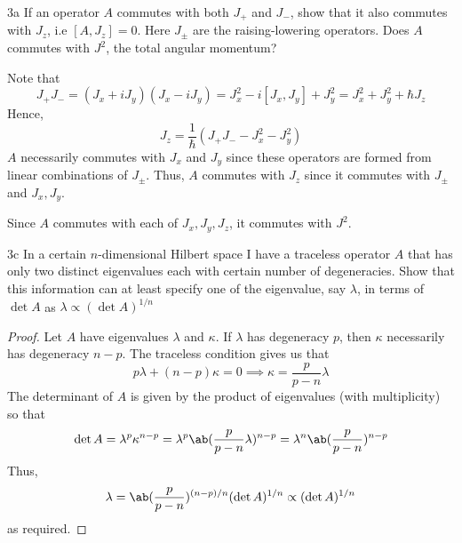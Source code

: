 \documentclass[12pt]{article}
\begin{document}
\newpage
\begin{exc}{3a}
If an operator $A$ commutes with both $J_+$ and $J_-$, show that it also
commutes with $J_z$, i.e $[A, J_z] = 0$. Here $J_{\pm}$ are the raising-lowering
operators. Does $A$ commutes with $J^2$, the total angular momentum?
\end{exc}
\begin{ans}
    Note that 
    \[J_+J_- = (J_x + iJ_y)(J_x - iJ_y) = J_x^2 -i[J_x, J_y] + J_y^2 = J_x^2 + J_y^2 + \hbar J_z\]
    Hence, 
    \[J_z = \frac1\hbar(J_+J_- - J_x^2 - J_y^2)\]
    $A$ necessarily commutes with $J_x$ and $J_y$ since these operators are formed from linear combinations of $J_\pm$. Thus, $A$ commutes with $J_z$ since it commutes with $J_\pm$ and $J_x, J_y$. 

    
    Since $A$ commutes with each of $J_x, J_y, J_z$, it commutes with $J^2$.
\end{ans}

\begin{exc}{3c}
In a certain $n$-dimensional Hilbert space I have a traceless operator
$A$ that has only two distinct eigenvalues each with certain number of
degeneracies. Show that this information can at least specify one of the
eigenvalue, say $\lambda$, in terms of $\det A$ as $\lambda \propto (\det A)^{1/n}$
\end{exc}
\begin{proof}
    Let $A$ have eigenvalues $\lambda$ and $\kappa$. If $\lambda$ has degeneracy $p$, then $\kappa$ necessarily has degeneracy $n - p$. The traceless condition gives us that 
    \[p\lambda + (n - p)\kappa = 0 \implies \kappa = \frac{p}{p - n}\lambda\]
    The determinant of $A$ is given by the product of eigenvalues (with multiplicity) so that 
    \[\det A = \lambda^p \kappa^{n - p} = \lambda^p \ab(\frac{p}{p - n}\lambda)^{n - p} = \lambda^n \ab(\frac{p}{p - n})^{n - p}\]
    Thus, 
    \[\lambda = \ab(\frac{p}{p - n})^{(n - p)/n}(\det A)^{1/n} \propto (\det A)^{1/n}\]
    as required.
\end{proof}
\end{document}
